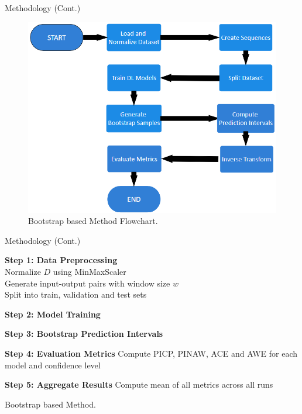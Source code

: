 \documentclass[xcolor=dvipsnames,aspectratio=169]{beamer}
\begin{document}
\begin{frame}{Methodology (Cont.)}
\begin{figure}
    \centering
    \includegraphics[width=0.5\linewidth]{Bootstrap.png}
    \caption{Bootstrap based Method Flowchart.}
    \label{fig:enter-label}
\end{figure}
\end{frame}

\begin{frame}{Methodology (Cont.)}
\begin{algorithm}[H]
\tiny
{}
\SetAlgoCaptionSeparator{:}


\textbf{Step 1: Data Preprocessing}\\
Normalize $D$ using MinMaxScaler\\
Generate input-output pairs with window size $w$\\
Split into train, validation and test sets

\textbf{Step 2: Model Training}\\

\textbf{Step 3: Bootstrap Prediction Intervals}\\

\textbf{Step 4: Evaluation Metrics}
Compute PICP, PINAW, ACE and AWE for each model and confidence level

\textbf{Step 5: Aggregate Results}
Compute mean of all metrics across all runs

\caption{Bootstrap based Method.}
\end{algorithm}

\end{frame}
\end{document}
